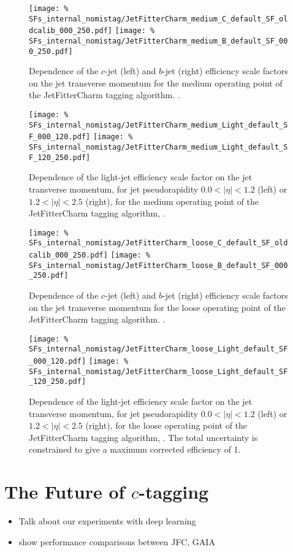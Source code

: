\begin{figure}
  \centering
    \texttt{[image: \%
SFs\_internal\_nomistag/JetFitterCharm\_medium\_C\_default\_SF\_oldcalib\_000\_250.pdf]}
  \texttt{[image: \%
SFs\_internal\_nomistag/JetFitterCharm\_medium\_B\_default\_SF\_000\_250.pdf]}
  \caption{Dependence of the $c$-jet (left) and $b$-jet (right) efficiency scale factors on the jet transverse momentum for the medium operating point of the
    JetFitterCharm tagging algorithm. \bcSF.}
  \label{JFC_SF_B}
\end{figure}

\begin{figure}
  \centering
    \texttt{[image: \%
SFs\_internal\_nomistag/JetFitterCharm\_medium\_Light\_default\_SF\_000\_120.pdf]}
  \texttt{[image: \%
SFs\_internal\_nomistag/JetFitterCharm\_medium\_Light\_default\_SF\_120\_250.pdf]}
  \caption{Dependence of the light-jet efficiency scale factor on the jet transverse momentum, for jet pseudorapidity $0.0 < | \eta | < 1.2$ (left) or 
    $1.2 < | \eta | < 2.5$ (right), for the medium operating point of the  JetFitterCharm tagging algorithm, \lSF.}
  \label{JFC_SF_L1}
\end{figure}


\begin{figure}
  \centering
  \texttt{[image: \%
SFs\_internal\_nomistag/JetFitterCharm\_loose\_C\_default\_SF\_oldcalib\_000\_250.pdf]}
  \texttt{[image: \%
SFs\_internal\_nomistag/JetFitterCharm\_loose\_B\_default\_SF\_000\_250.pdf]}
  \caption{Dependence of the $c$-jet (left) and $b$-jet (right) efficiency scale factors on the jet transverse momentum for the loose operating point of the 
    JetFitterCharm tagging algorithm. \bcSF.}
  \label{JFC_SF_B_loose}
\end{figure}

\begin{figure}
  \centering
  \texttt{[image: \%
SFs\_internal\_nomistag/JetFitterCharm\_loose\_Light\_default\_SF\_000\_120.pdf]}
  \texttt{[image: \%
SFs\_internal\_nomistag/JetFitterCharm\_loose\_Light\_default\_SF\_120\_250.pdf]}
  \caption{Dependence of the light-jet efficiency scale factor on the jet transverse momentum, for jet pseudorapidity $0.0 < | \eta | < 1.2$ (left) or 
    $1.2 < | \eta | < 2.5$ (right), for the loose operating point of the JetFitterCharm tagging algorithm, \lSF. The total uncertainty is constrained to give a maximum corrected efficiency of 1.}
  \label{JFC_SF_L1_loose}
\end{figure}




\section{The Future of $c$-tagging}
\begin{itemize}
\item Talk about our experiments with deep learning
\item  show performance comparisons between JFC, GAIA
\end{itemize}
